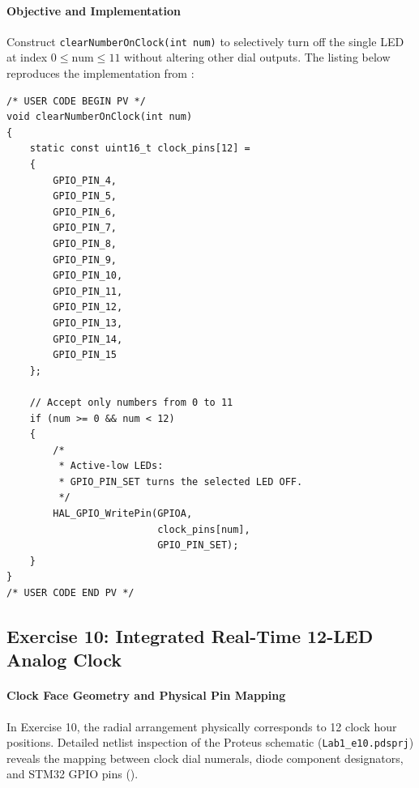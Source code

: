 \documentclass[oneside,final]{hcmut-report}
\begin{document}
\paragraph{Objective and Implementation}
Construct \texttt{clearNumberOnClock(int num)} to selectively turn off the single LED at index $0 \le \text{num} \le 11$ without altering other dial outputs. The listing below reproduces the implementation from :

\begin{lstlisting}[caption={[clearNumberOnClock() function]{Complete clearNumberOnClock(int num) implementation (Lab1\_e9/Core/Src/main.c)}},label={lst:ex9_func},basicstyle=\fontsize{7.0pt}{7.8pt}\ttfamily,lineskip=0pt,aboveskip=0pt,belowskip=0pt]
/* USER CODE BEGIN PV */
void clearNumberOnClock(int num)
{
    static const uint16_t clock_pins[12] =
    {
        GPIO_PIN_4,
        GPIO_PIN_5,
        GPIO_PIN_6,
        GPIO_PIN_7,
        GPIO_PIN_8,
        GPIO_PIN_9,
        GPIO_PIN_10,
        GPIO_PIN_11,
        GPIO_PIN_12,
        GPIO_PIN_13,
        GPIO_PIN_14,
        GPIO_PIN_15
    };

    // Accept only numbers from 0 to 11
    if (num >= 0 && num < 12)
    {
        /*
         * Active-low LEDs:
         * GPIO_PIN_SET turns the selected LED OFF.
         */
        HAL_GPIO_WritePin(GPIOA,
                          clock_pins[num],
                          GPIO_PIN_SET);
    }
}
/* USER CODE END PV */
\end{lstlisting}

\subsection{Exercise 10: Integrated Real-Time 12-LED Analog Clock}
\label{subsec:ex10}
\paragraph{Clock Face Geometry and Physical Pin Mapping}
In Exercise 10, the radial arrangement physically corresponds to 12 clock hour positions. Detailed netlist inspection of the Proteus schematic (\texttt{Lab1\_e10.pdsprj}) reveals the mapping between clock dial numerals, diode component designators, and STM32 GPIO pins ().
\end{document}
